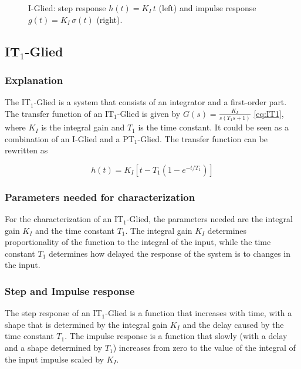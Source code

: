 \documentclass[12pt, oneside, a4paper]{scrreprt}
\begin{document}
                    \begin{figure}[ht]
                        \centering
                        
                        \caption{I-Glied: step response $h(t) = K_I\,t$ (left) and impulse response $g(t) = K_I\,\sigma(t)$ (right).}
                        \label{fig:I-Glied-responses}
                    \end{figure}

            \cleardoublepage

            \subsection{IT$_1$-Glied}
                \subsubsection{Explanation}
                    The IT$_1$-Glied is a system that consists of an integrator and a first-order part. The transfer function of an IT$_1$-Glied is given by $G(s) = \frac{K_I}{s (T_1 s + 1)}$ \ref{eq:IT1}, where $K_I$ is the integral gain and $T_1$ is the time constant. It could be seen as a combination of an I-Glied and a PT$_1$-Glied. The transfer function can be rewritten as

                    \begin{equation}
                        h(t) = K_I \left[t-T_1\left(1-e^{-t/T_1}\right)\right]
                    \end{equation} 

                \subsubsection{Parameters needed for characterization}
                    For the characterization of an IT$_1$-Glied, the parameters needed are the integral gain $K_I$ and the time constant $T_1$. The integral gain $K_I$ determines proportionality of the function to the integral of the input, while the time constant $T_1$ determines how delayed the response of the system is to changes in the input.

                \subsubsection{Step and Impulse response}
                    The step response of an IT$_1$-Glied is a function that increases with time, with a shape that is determined by the integral gain $K_I$ and the delay caused by the time constant $T_1$. The impulse response is a function that slowly (with a delay and a shape determined by $T_1$) increases from zero to the value of the integral of the input impulse scaled by $K_I$.
\end{document}
